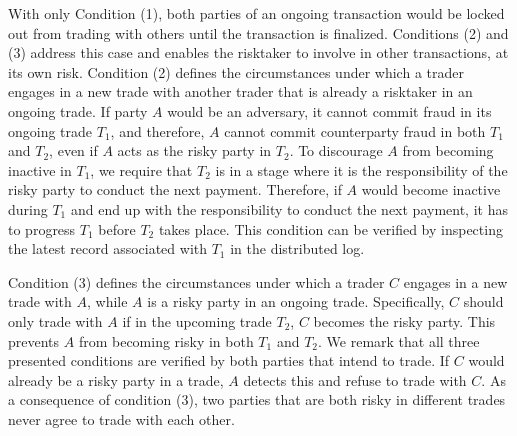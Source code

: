 With only Condition (1), both parties of an ongoing transaction would be locked out from trading with others until the transaction is finalized.
Conditions (2) and (3) address this case and enables the risktaker to involve in other transactions, at its own risk.
Condition (2) defines the circumstances under which a trader engages in a new trade with another trader that is already a risktaker in an ongoing trade.
If party $ A $ would be an adversary, it cannot commit fraud in its ongoing trade $ T_1 $, and therefore, $ A $ cannot commit counterparty fraud in both $ T_1 $ and $ T_2 $, even if $ A $ acts as the risky party in $ T_2 $.
To discourage $ A $ from becoming inactive in $ T_1 $, we require that $ T_2 $ is in a stage where it is the responsibility of the risky party to conduct the next payment.
Therefore, if $ A $ would become inactive during $ T_1 $ and end up with the responsibility to conduct the next payment, it has to progress $ T_1 $ before $ T_2 $ takes place.
This condition can be verified by inspecting the latest record associated with $ T_1 $ in the distributed log.

Condition (3) defines the circumstances under which a trader $ C $ engages in a new trade with $ A $, while $ A $ is a risky party in an ongoing trade.
Specifically, $ C $ should only trade with $ A $ if in the upcoming trade $ T_2 $, $ C $ becomes the risky party.
This prevents $ A $ from becoming risky in both $ T_1 $ and $ T_2 $.
We remark that all three presented conditions are verified by both parties that intend to trade.
If $ C $ would already be a risky party in a trade, $ A $ detects this and refuse to trade with $ C $.
As a consequence of condition (3), two parties that are both risky in different trades never agree to trade with each other.

